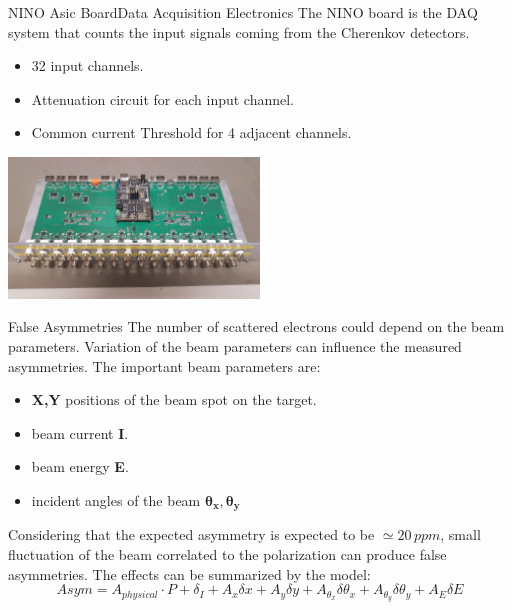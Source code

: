 \documentclass[9pt,a4paper]{beamer}
\begin{document}
\begin{frame}[t]{NINO Asic Board}{Data Acquisition Electronics}
The NINO board is the DAQ system that counts the input signals coming from the Cherenkov detectors. 

\begin{itemize}
\item 32 input channels.
\item Attenuation circuit for each input channel.
\item Common current Threshold for 4 adjacent channels.
\end{itemize}

\begin{center}
\includegraphics[width = 0.5\textwidth]{figures/NINO.pdf}
\end{center}

\end{frame}

\begin{frame}[t]{False Asymmetries}
The number of scattered electrons could depend on the beam parameters. Variation of the beam parameters can influence the measured asymmetries. The important beam parameters are:
\begin{itemize}
\item \textbf{X,Y} positions of the beam spot on the target.
\item beam current \textbf{I}.
\item beam energy \textbf{E}.
\item incident angles of the beam {$\bm{\theta_{x}},\bm{\theta_{y}}$}
\end{itemize}

Considering that the expected asymmetry is expected to be $\simeq 20 \, ppm$, small fluctuation of the beam correlated to the polarization can produce false asymmetries. The effects can be summarized by the model:
\begin{equation}
Asym = A_{physical} \cdot P + \delta_{I} + A_{x} \delta x + A_{y} \delta y + A_{\theta_{x}} \delta \theta_{x} + A_{\theta_{y}} \delta \theta_{y}+ A_{E} \delta E 
\end{equation}
\end{frame}
\end{document}
